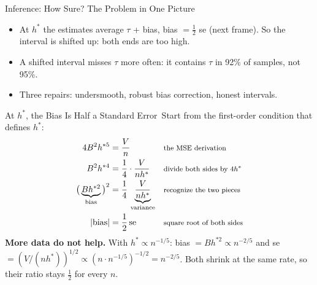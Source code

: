 \documentclass[aspectratio=169,11pt,xcolor=dvipsnames]{beamer}
\newcommand{\adv}{\,\raisebox{0.6pt}{\textcolor{accent}{$\bigstar$}}}
\begin{document}
\begin{frame}{Inference: How Sure? The Problem in One Picture}
\vskip-4pt
\begin{center}
\end{center}
\vskip-2pt
\begin{itemize}\itemsep2pt
  \item At $h^{*}$ the estimates average $\tau$ + bias, bias $= \tfrac12$ se (next frame).
        So the interval is shifted up: \alert{both ends are too high}.
  \item A shifted interval misses $\tau$ more often: it contains $\tau$ in
        \alert{92\% of samples, not 95\%}.
  \item Three repairs: undersmooth, robust bias correction, honest intervals.
\end{itemize}
\end{frame}

\begin{frame}{At $h^{*}$, the Bias Is Half a Standard Error\adv}
Start from the first-order condition that defines $h^{*}$:
\begin{align*}
  4B^2 h^{*5} &= \frac{V}{n}
   && \text{\footnotesize the MSE derivation} \\
  B^2 h^{*4} &= \frac14 \cdot \frac{V}{n h^{*}}
   && \text{\footnotesize divide both sides by $4h^{*}$} \\
  \big(\underbrace{Bh^{*2}}_{\text{bias}}\big)^2 &= \frac14\,\underbrace{\frac{V}{nh^{*}}}_{\text{variance}}
   && \text{\footnotesize recognize the two pieces} \\
  |\text{bias}| &= \frac12\,\text{se}
   && \text{\footnotesize square root of both sides}
\end{align*}
\vskip-2pt
\textbf{More data do not help.} With $h^{*} \propto n^{-1/5}$: bias $= Bh^{*2} \propto n^{-2/5}$
and se $= (V/(nh^{*}))^{1/2} \propto (n \cdot n^{-1/5})^{-1/2} = n^{-2/5}$. Both shrink at
the same rate, so their ratio stays $\tfrac12$ for every $n$.
\end{frame}
\end{document}
